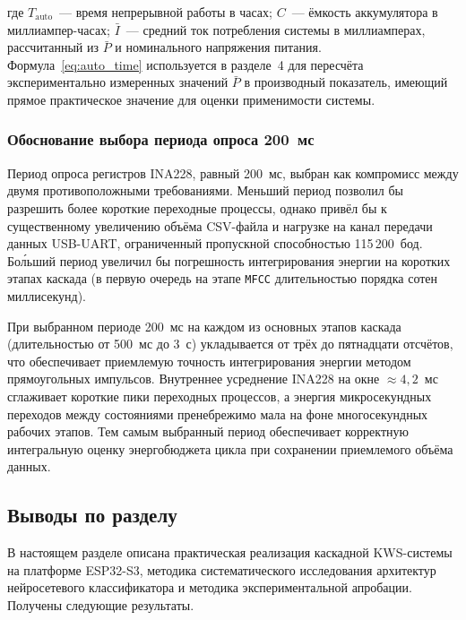 где $T_{\mathrm{auto}}$~--- время непрерывной работы в часах;
$C$~--- ёмкость аккумулятора в миллиампер-часах; $\bar{I}$~---
средний ток потребления системы в миллиамперах, рассчитанный из
$\bar{P}$ и номинального напряжения питания.
Формула~\eqref{eq:auto_time} используется в разделе~4 для
пересчёта экспериментально измеренных значений $\bar{P}$ в
производный показатель, имеющий прямое практическое значение для
оценки применимости системы.

\subsubsection{Обоснование выбора периода опроса 200~мс}

Период опроса регистров INA228, равный 200~мс, выбран как
компромисс между двумя противоположными требованиями. Меньший
период позволил бы разрешить более короткие переходные
процессы, однако привёл бы к существенному увеличению объёма
CSV-файла и нагрузке на канал передачи данных USB-UART,
ограниченный пропускной способностью 115\,200~бод. Бо\'{л}ьший
период увеличил бы погрешность интегрирования энергии на
коротких этапах каскада (в первую очередь на этапе \texttt{MFCC}
длительностью порядка сотен миллисекунд).

При выбранном периоде 200~мс на каждом из основных этапов
каскада (длительностью от 500~мс до 3~с) укладывается от трёх до
пятнадцати отсчётов, что обеспечивает приемлемую точность
интегрирования энергии методом прямоугольных импульсов.
Внутреннее усреднение INA228 на окне $\approx 4{,}2$~мс
сглаживает короткие пики переходных процессов, а энергия
микросекундных переходов между состояниями пренебрежимо мала на
фоне многосекундных рабочих этапов. Тем самым выбранный период
обеспечивает корректную интегральную оценку энергобюджета цикла
при сохранении приемлемого объёма данных.

\subsection{Выводы по разделу}

В настоящем разделе описана практическая реализация каскадной
KWS-системы на платформе ESP32-S3, методика систематического
исследования архитектур нейросетевого классификатора и методика
экспериментальной апробации. Получены следующие результаты.

